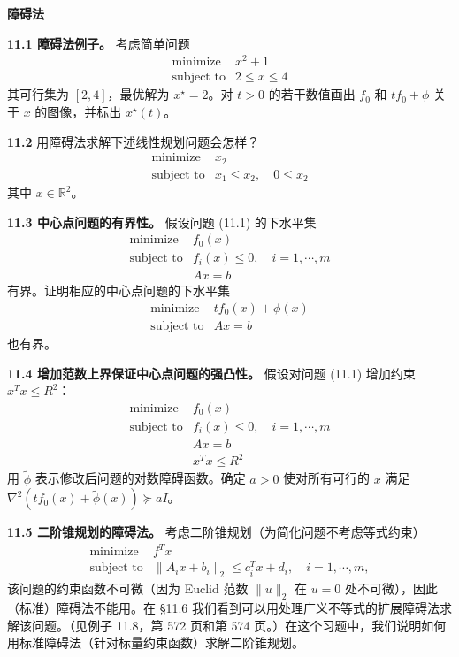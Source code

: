\documentclass[UTF8,12pt,a4paper,fontset=fandol]{ctexart}
\begin{document}
\noindent\textbf{障碍法}

\noindent\textbf{11.1 障碍法例子。} 考虑简单问题
\[
\begin{array}{ll}
\text{minimize} & x^2+1\\
\text{subject to} & 2\leq x\leq 4
\end{array}
\]
其可行集为 $[2,4]$，最优解为 $x^\star=2$。对 $t>0$ 的若干数值画出 $f_0$ 和 $tf_0+\phi$ 关于 $x$ 的图像，并标出 $x^\star(t)$。

\noindent\textbf{11.2} 用障碍法求解下述线性规划问题会怎样？
\[
\begin{array}{ll}
\text{minimize} & x_2\\
\text{subject to} & x_1\leq x_2,\quad 0\leq x_2
\end{array}
\]
其中 $x\in\mathbb{R}^2$。

\noindent\textbf{11.3 中心点问题的有界性。} 假设问题 (11.1) 的下水平集
\[
\begin{array}{ll}
\text{minimize} & f_0(x)\\
\text{subject to} & f_i(x)\leq 0,\quad i=1,\cdots,m\\
& Ax=b
\end{array}
\]
有界。证明相应的中心点问题的下水平集
\[
\begin{array}{ll}
\text{minimize} & tf_0(x)+\phi(x)\\
\text{subject to} & Ax=b
\end{array}
\]
也有界。

\noindent\textbf{11.4 增加范数上界保证中心点问题的强凸性。} 假设对问题 (11.1) 增加约束 $x^Tx\leq R^2$：
\[
\begin{array}{ll}
\text{minimize} & f_0(x)\\
\text{subject to} & f_i(x)\leq 0,\quad i=1,\cdots,m\\
& Ax=b\\
& x^Tx\leq R^2
\end{array}
\]
用 $\tilde{\phi}$ 表示修改后问题的对数障碍函数。确定 $a>0$ 使对所有可行的 $x$ 满足 $\nabla^2(tf_0(x)+\tilde{\phi}(x))\succeq aI$。

\noindent\textbf{11.5 二阶锥规划的障碍法。} 考虑二阶锥规划（为简化问题不考虑等式约束）
\begin{equation}
\begin{array}{ll}
\text{minimize} & f^Tx\\
\text{subject to} & \|A_ix+b_i\|_2\leq c_i^Tx+d_i,\quad i=1,\cdots,m,
\end{array}
\tag{11.63}
\end{equation}
该问题的约束函数不可微（因为 Euclid 范数 $\|u\|_2$ 在 $u=0$ 处不可微），因此（标准）障碍法不能用。在 \S11.6 我们看到可以用处理广义不等式的扩展障碍法求解该问题。（见例子 11.8，第 572 页和第 574 页。）在这个习题中，我们说明如何用标准障碍法（针对标量约束函数）求解二阶锥规划。
\end{document}
